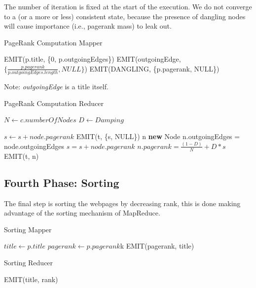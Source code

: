 \noindent The number of iteration is fixed at the start of the execution. We do not converge to a (or a more or less) consistent state, because the presence of dangling nodes will cause importance (i.e., pagerank mass) to leak out.

\begin{algorithm}
	\caption{PageRank Computation Mapper}\label{Mapper}
		\begin{algorithmic}[1]
			
			\State EMIT(p.title, \{0, p.outgoingEdges\})
			\State EMIT(outgoingEdge, $\{\frac{p.pagerank}{p.outgoingEdges.length}, NULL\}$)
			\EndFor
			\Else
			\State EMIT(DANGLING, \{p.pagerank, NULL\})
			\EndIf
			\EndProcedure
	\end{algorithmic}
\end{algorithm}
Note: \textit{outgoingEdge} is a title itself.


\begin{algorithm}[H]
	\caption{PageRank Computation Reducer}\label{Reducer}
		\begin{algorithmic}[1]
				\State $N \gets c.numberOfNodes$
				\State $D \gets Damping$
			\EndProcedure
		
						\State $s \gets s + node.pagerank$	
					\EndFor
					\State EMIT(t, \{s, NULL\})
				\Else
					\State n \textbf{new} Node
							\State n.outgoingEdges = node.outgoingEdges
						\Else
							\State $s = s + node.pagerank$
						\EndIf
					\EndFor
					\State$n.pagerank =  \frac{(1-D)}{N} + D*s$
					\State EMIT(t, n)
				\EndIf
			\EndProcedure
	\end{algorithmic}
\end{algorithm}



\subsection{Fourth Phase: Sorting}
The final step is sorting the webpages by decreasing rank, this is done making advantage of the sorting mechanism of MapReduce.

\begin{algorithm}[H]
	\caption{Sorting Mapper}\label{Mapper}
	\begin{algorithmic}[1]
		\State $title \gets p.title$
		\State $pagerank \gets p.pagerank$k
		\State EMIT(pagerank, title)
		\EndProcedure
	\end{algorithmic}
\end{algorithm}

\begin{algorithm}[H]
	\caption{Sorting Reducer}\label{Reducer}
	\begin{algorithmic}[1]
		\State EMIT(title, rank)
		\EndFor
		\EndProcedure
	\end{algorithmic}
\end{algorithm}
